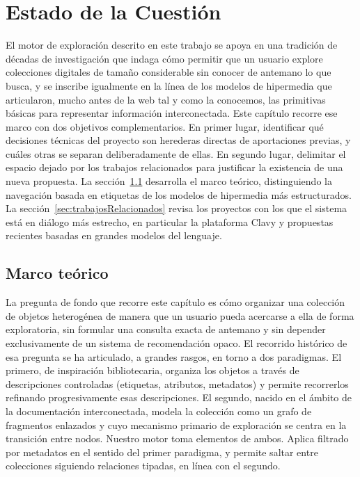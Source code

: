 \chapter{Estado de la Cuestión}
\label{cap:estadoDeLaCuestion}


El motor de exploración descrito en este trabajo se apoya en una tradición de
décadas de investigación que indaga cómo permitir que un usuario explore colecciones digitales de tamaño
considerable sin conocer de antemano lo que busca, y se inscribe igualmente en la línea de los modelos
de hipermedia que articularon, mucho antes de la web tal y como la conocemos, las primitivas básicas
para representar información interconectada. Este capítulo recorre ese marco con dos objetivos
complementarios. En primer lugar, identificar qué decisiones técnicas del proyecto son herederas
directas de aportaciones previas, y cuáles otras se separan deliberadamente de ellas. En segundo lugar,
delimitar el espacio dejado por los trabajos relacionados para justificar la existencia de una nueva
propuesta. La sección~\ref{sec:marcoTeorico} desarrolla el marco teórico, distinguiendo la navegación
basada en etiquetas de los modelos de hipermedia más estructurados. La sección~\ref{sec:trabajosRelacionados}
revisa los proyectos con los que el sistema está en diálogo más estrecho, en particular la plataforma Clavy
y propuestas recientes basadas en grandes modelos del lenguaje.

\section{Marco teórico}
\label{sec:marcoTeorico}

La pregunta de fondo que recorre este capítulo es cómo organizar una colección de objetos heterogénea
de manera que un usuario pueda acercarse a ella de forma exploratoria, sin formular una consulta
exacta de antemano y sin depender exclusivamente de un sistema de recomendación opaco. El recorrido
histórico de esa pregunta se ha articulado, a grandes rasgos, en torno a dos paradigmas. El primero, de
inspiración bibliotecaria, organiza los objetos a través de descripciones controladas (etiquetas, atributos,
metadatos) y permite recorrerlos refinando progresivamente esas descripciones. El segundo, nacido en el
ámbito de la documentación interconectada, modela la colección como un grafo de fragmentos enlazados
y cuyo mecanismo primario de exploración se centra en la transición entre nodos. Nuestro motor toma
elementos de ambos. Aplica filtrado por metadatos en el sentido del primer paradigma, y permite saltar
entre colecciones siguiendo relaciones tipadas, en línea con el segundo.

